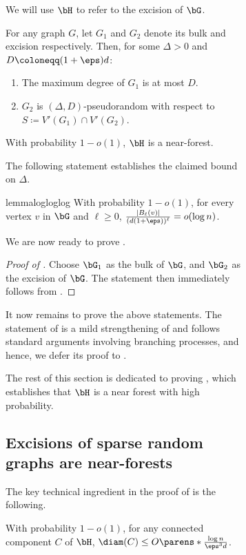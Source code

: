 \documentclass[11pt,letterpaper]{article}
\begin{document}
\begin{figure}
\begin{figure}
\begin{notation*}[$\bH$]
    We will use $\bH$ to refer to the excision of $\bG$.
\end{notation*}


\begin{observation} \label{obs:excision-bound-pseudorandom}
    For any graph $G$, let $G_1$ and $G_2$ denote its bulk and excision respectively.
    Then, for some $\Delta > 0$ and $D \coloneqq (1+\eps)d$:
    \begin{enumerate}
        \item The maximum degree of $G_1$ is at most $D$.
        \item $G_2$ is $(\Delta,D)$-pseudorandom with respect to $S\coloneqq V'(G_1)\cap V'(G_2)$.
    \end{enumerate}
\end{observation}

\begin{lemma}   \label{lem:components-tree-excess-1}
    With probability $1-o(1)$, $\bH$ is a near-forest.
\end{lemma}
The following statement establishes the claimed bound on $\Delta$.
\begin{restatable}{lemma}{logloglog}    \label{lem:log-star-bound}
    With probability $1-o(1)$, for every vertex $v$ in $\bG$ and $\ell \ge 0$, $\frac{|B_\ell(v)|}{(d(1+\eps))^{\ell}} = o(\log n)$.
\end{restatable}

We are now ready to prove .
\begin{proof}[Proof of ]
    Choose $\bG_1$ as the bulk of $\bG$, and $\bG_2$ as the excision of $\bG$. 
    The statement then immediately follows from .
\end{proof}


It now remains to prove the above statements.
The statement of  is a mild strengthening of \cite[Lemma 9 of arXiv version]{BGGS24} and follows standard arguments involving branching processes, and hence, we defer its proof to .

The rest of this section is dedicated to proving , which establishes that $\bH$ is a near forest with high probability.

\subsection{Excisions of sparse random graphs are near-forests}
The key technical ingredient in the proof of  is the following.
\begin{lemma}
    \label{lem:components-diam}
    With probability $1-o(1)$, for any connected component $C$ of $\bH$, $\diam(C) \le O\parens*{\tfrac{\log n}{\eps^3 d}}$.
\end{lemma}


\end{figure}
\end{figure}
\end{document}
